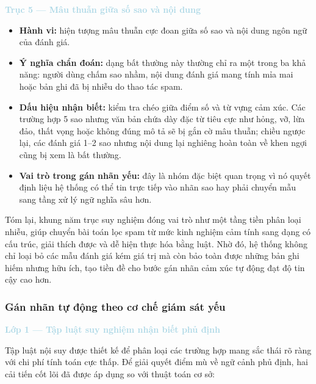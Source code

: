 \vspace{0.5em}
\noindent\textcolor{lightblue}{\textbf{Trục 5 --- Mâu thuẫn giữa số sao và nội dung}}\par
\vspace{0.5em}

\begin{itemize}[labelsep=10pt, leftmargin=2cm]
    \item \textbf{Hành vi:} hiện tượng mâu thuẫn cực đoan giữa số sao và nội dung ngôn ngữ của đánh giá.
    \item \textbf{Ý nghĩa chẩn đoán:} dạng bất thường này thường chỉ ra một trong ba khả năng: người dùng chấm sao nhầm, nội dung đánh giá mang tính mỉa mai hoặc bản ghi đã bị nhiễu do thao tác spam.
    \item \textbf{Dấu hiệu nhận biết:} kiểm tra chéo giữa điểm số và từ vựng cảm xúc. Các trường hợp 5 sao nhưng văn bản chứa dày đặc từ tiêu cực như hỏng, vỡ, lừa đảo, thất vọng hoặc không đúng mô tả sẽ bị gắn cờ mâu thuẫn; chiều ngược lại, các đánh giá 1--2 sao nhưng nội dung lại nghiêng hoàn toàn về khen ngợi cũng bị xem là bất thường.
    \item \textbf{Vai trò trong gán nhãn yếu:} đây là nhóm đặc biệt quan trọng vì nó quyết định liệu hệ thống có thể tin trực tiếp vào nhãn sao hay phải chuyển mẫu sang tầng xử lý ngữ nghĩa sâu hơn.
\end{itemize}

Tóm lại, khung năm trục suy nghiệm đóng vai trò như một tầng tiền phân loại nhiễu, giúp chuyển bài toán lọc spam từ mức kinh nghiệm cảm tính sang dạng có cấu trúc, giải thích được và dễ hiện thực hóa bằng luật. Nhờ đó, hệ thống không chỉ loại bỏ các mẫu đánh giá kém giá trị mà còn bảo toàn được những bản ghi hiếm nhưng hữu ích, tạo tiền đề cho bước gán nhãn cảm xúc tự động đạt độ tin cậy cao hơn.

\subsubsection{Gán nhãn tự động theo cơ chế giám sát yếu} 

\vspace{0.5em}
\noindent\textcolor{lightblue}{\textbf{Lớp 1 --- Tập luật suy nghiệm nhận biết phủ định}}
\vspace{0.5em}

Tập luật nội suy được thiết kế để phân loại các trường hợp mang sắc thái rõ ràng với chi phí tính toán cực thấp. Để giải quyết điểm mù về ngữ cảnh phủ định, hai cải tiến cốt lõi đã được áp dụng so với thuật toán cơ sở:

